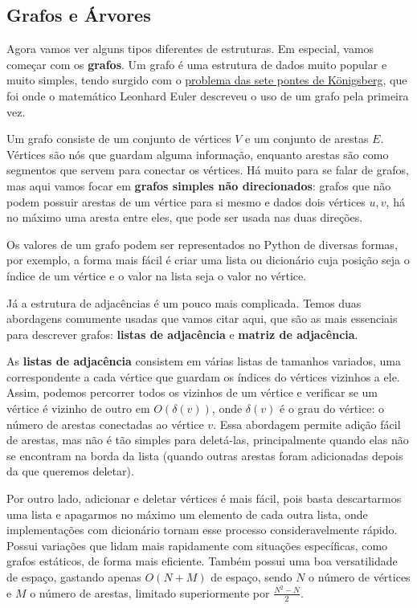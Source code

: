 \documentclass[11pt, a4paper]{article}
\begin{document}
\subsection{Grafos e Árvores}

Agora vamos ver alguns tipos diferentes de estruturas. Em especial, vamos começar com os \textbf{grafos}. Um grafo é uma estrutura de dados muito popular e muito simples, tendo surgido com o \href{https://en.wikipedia.org/wiki/Seven_Bridges_of_K%C3%B6nigsberg}{problema das sete pontes de K\"{o}nigsberg}, que foi onde o matemático Leonhard Euler descreveu o uso de um grafo pela primeira vez.

Um grafo consiste de um conjunto de vértices \(V\) e um conjunto de arestas \(E\). Vértices são nós que guardam alguma informação, enquanto arestas são como segmentos que servem para conectar os vértices. Há muito para se falar de grafos, mas aqui vamos focar em \textbf{grafos simples não direcionados}: grafos que não podem possuir arestas de um vértice para si mesmo e dados dois vértices \(u,v\), há no máximo uma aresta entre eles, que pode ser usada nas duas direções.

Os valores de um grafo podem ser representados no Python de diversas formas, por exemplo, a forma mais fácil é criar uma lista ou dicionário cuja posição seja o índice de um vértice e o valor na lista seja o valor no vértice. 

Já a estrutura de adjacências é um pouco mais complicada. Temos duas abordagens comumente usadas que vamos citar aqui, que são as mais essenciais para descrever grafos: \textbf{listas de adjacência} e \textbf{matriz de adjacência}.

As \textbf{listas de adjacência} consistem em várias listas de tamanhos variados, uma correspondente a cada vértice que guardam os índices do vértices vizinhos a ele. Assim, podemos percorrer todos os vizinhos de um vértice e verificar se um vértice é vizinho de outro em \(O(\delta(v))\), onde \(\delta(v)\) é o grau do vértice: o número de arestas conectadas ao vértice \(v\). Essa abordagem permite adição fácil de arestas, mas não é tão simples para deletá-las, principalmente quando elas não se encontram na borda da lista (quando outras arestas foram adicionadas depois da que queremos deletar). 

Por outro lado, adicionar e deletar vértices é mais fácil, pois basta descartarmos uma lista e apagarmos no máximo um elemento de cada outra lista, onde implementações com dicionário tornam esse processo consideravelmente rápido. Possui variações que lidam mais rapidamente com situações específicas, como grafos estáticos, de forma mais eficiente. Também possui uma boa versatilidade de espaço, gastando apenas \(O(N+M)\) de espaço, sendo \(N\) o número de vértices e \(M\) o número de arestas, limitado superiormente por \(\frac{N^2-N}{2}\).
\end{document}
